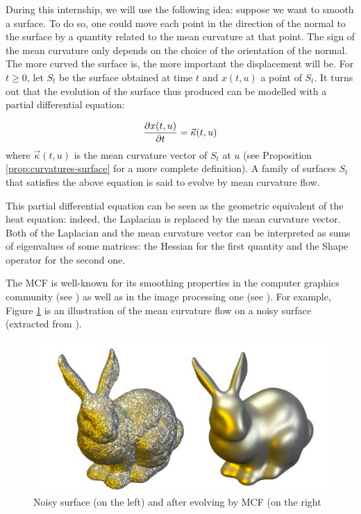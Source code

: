 During this internship, we will use the following idea: suppose we want to
smooth a surface. To do so, one could move each point in the direction of the
normal to the surface by a quantity related to the mean curvature at that point.
The sign of the mean curvature only depends on the choice of the orientation of
the normal.  The more curved the surface is, the more important the displacement
will be. For $ t \geq 0 $, let $ S_t $ be the surface obtained at time $ t $ and
$ x(t, u) $ a point of $ S_t $. It turns out that the evolution of the surface
thus produced can be modelled with a partial differential equation:

$$ \frac{\partial{x(t, u)}}{\partial{t}} = \vec{\kappa}(t, u) $$
where $ \vec{\kappa}(t, u) $ is the mean curvature vector of $ S_t $ at $ u $
(see Proposition \ref{prop:curvatures-surface} for a more complete definition).
A family of surfaces $ S_t $ that satisfies the above equation is said to evolve
by mean curvature flow.

This partial differential equation can be seen as the geometric equivalent of
the heat equation: indeed, the Laplacian is replaced by the mean curvature
vector. Both of the Laplacian and the mean curvature vector can be interpreted
as sums of eigenvalues of some matrices: the Hessian for the first quantity and
the Shape operator for the second one.

The MCF is well-known for its smoothing properties in the computer graphics
community (see \cite{desbrun1999implicit}) as well as in the image processing
one (see \cite{ciomaga2010level}). For example, Figure
\ref{fig:mean-curvature-flow-ex} is an illustration of the mean curvature flow
on a noisy surface (extracted from \cite{clarenz2000anisotropic}).

\begin{figure}[h]
    \centering
    \includegraphics[scale=0.3]{img/mean-curvature-flow-rabbit}
    \caption{Noisy surface (on the left) and after evolving by MCF (on the
        right}
    \label{fig:mean-curvature-flow-ex}
\end{figure}

